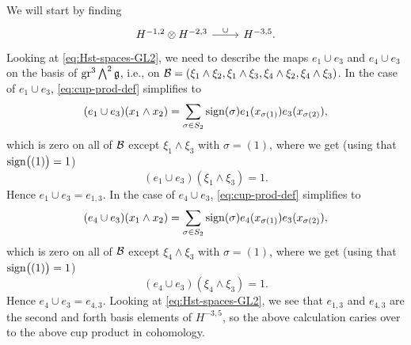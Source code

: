 We will start by finding
\[
  \begin{tikzcd}
    H^{-1,2} \otimes H^{-2,3} \ar[r,"\cup"] & H^{-3,5}.
  \end{tikzcd}
\]
Looking at \eqref{eq:Hst-spaces-GL2}, we need to describe the maps $e_{1} \cup e_{3}$ and $e_{4} \cup e_{3}$ on the basis of $\operatorname{gr}^{3} \bigwedge^{2}\mathfrak{g}$, i.e., on $\mathcal{B} = (\xi_{1}\wedge\xi_{2}, \xi_{1} \wedge \xi_{3},\xi_{4} \wedge \xi_{2},\xi_{4} \wedge \xi_{3})$. In the case of $e_{1} \cup e_{3}$, \eqref{eq:cup-prod-def} simplifies to
\begin{equation*}
  (e_{1} \cup e_{3})(x_{1} \wedge x_{2}) = \sum_{\sigma \in S_{2}} \operatorname{sign}(\sigma) e_{1}(x_{\sigma(1)}) e_{3}(x_{\sigma(2)}),
\end{equation*}
which is zero on all of $\mathcal{B}$ except $\xi_{1} \wedge \xi_{3}$ with $\sigma=(1)$, where we get (using that $\operatorname{sign}\bigl( (1) \bigr) = 1$)
\begin{equation*}
  (e_{1} \cup e_{3})(\xi_{1} \wedge \xi_{3}) = 1.
\end{equation*}
Hence $e_{1} \cup e_{3} = e_{1,3}$. In the case of $e_{4} \cup e_{3}$, \eqref{eq:cup-prod-def} simplifies to
\begin{equation*}
  (e_{4} \cup e_{3})(x_{1} \wedge x_{2}) = \sum_{\sigma \in S_{2}} \operatorname{sign}(\sigma) e_{4}(x_{\sigma(1)}) e_{3}(x_{\sigma(2)}),
\end{equation*}
which is zero on all of $\mathcal{B}$ except $\xi_{4} \wedge \xi_{3}$ with $\sigma=(1)$, where we get (using that $\operatorname{sign}\bigl( (1) \bigr) = 1$)
\begin{equation*}
  (e_{4} \cup e_{3})(\xi_{4} \wedge \xi_{3}) = 1.
\end{equation*}
Hence $e_{4} \cup e_{3} = e_{4,3}$. Looking at \eqref{eq:Hst-spaces-GL2}, we see that $e_{1,3}$ and $e_{4,3}$ are the second and forth basis elements of $H^{-3,5}$, so the above calculation caries over to the above cup product in cohomology.

